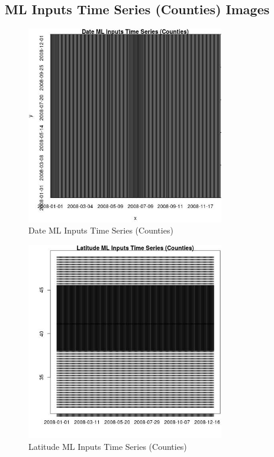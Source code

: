 
\subsection{ML Inputs Time Series (Counties) Images} 
 

\begin{figure} 
\centering  
\includegraphics[width=0.77\textwidth]{Code_Outputs/ML_input_report_ML_input_CountyGeometricCentroids_Locations_Dates_part_c_2008-01-01to2008-12-31_DateTS.jpg} 
\caption{\label{fig:ML_input_report_ML_input_CountyGeometricCentroids_Locations_Dates_part_c_2008-01-01to2008-12-31DateTS}Date ML Inputs Time Series (Counties)} 
\end{figure} 
 

\begin{figure} 
\centering  
\includegraphics[width=0.77\textwidth]{Code_Outputs/ML_input_report_ML_input_CountyGeometricCentroids_Locations_Dates_part_c_2008-01-01to2008-12-31_LatitudeTS.jpg} 
\caption{\label{fig:ML_input_report_ML_input_CountyGeometricCentroids_Locations_Dates_part_c_2008-01-01to2008-12-31LatitudeTS}Latitude ML Inputs Time Series (Counties)} 
\end{figure} 
 

